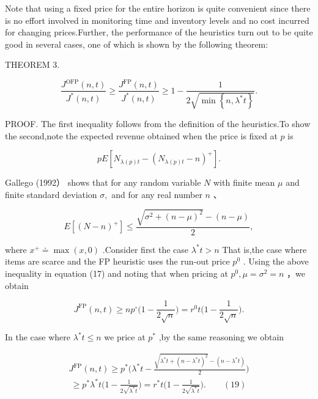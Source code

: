 Note that using a fixed price for the entire horizon is quite convenient
since there is no effort involved in monitoring time and inventory
levels and no cost incurred for changing prices.Further, the performance
of the heuristics turn out to be quite good in several cases, one of
which is shown by the following theorem:

THEOREM 3.

\[
\frac { J ^ { \mathrm { O F P } } ( n , t ) } { J ^ { * } ( n , t ) } \geq \frac { J ^ { \mathrm { F P } } ( n , t ) } { J ^ { * } ( n , t ) } \geq 1 - \frac { 1 } { 2 { \sqrt { \operatorname* { m i n } \left\{ n , \lambda ^ { * } t \right\} } } } .
\]

PROOF. The first inequality follows from the definition of the
heuristics.To show the second,note the expected revenue obtained when
the price is fixed at \(p\) is

\[
p E [ N _ { \lambda ( p ) t } - ( N _ { \lambda ( p ) t } - n ) ^ { + } ] .
\]

Gallego (1992） shows that for any random variable \(N\) with finite
mean \(\mu\) and finite standard deviation \(\sigma ,\) and for any real
number \(n\) 、

\[
E [ ( N - n ) ^ { + } ] \leq \frac { \sqrt { \sigma ^ { 2 } + ( n - \mu ) ^ { 2 } } - ( n - \mu ) } { 2 } ,
\]

where \({ { x } ^ { + } } \doteq \operatorname* { m a x } ( x , 0 )\)
.Consider first the case \(\lambda ^ { * } t > n\) That is,the case
where items are scarce and the FP heuristic uses the run-out price
\(p ^ { 0 }\) . Using the above inequality in equation (17) and noting
that when pricing at \(p ^ { 0 } , \mu = \sigma ^ { 2 } = n\) ，we
obtain

\[
J ^ { \mathrm { F P } } ( n , t ) \geq n p ^ { \circ } \Bigg ( 1 - \frac { 1 } { 2 \sqrt { n } } \Bigg ) = r ^ { 0 } t \Bigg ( 1 - \frac { 1 } { 2 \sqrt { n } } \Bigg ) .
\]

In the case where \(\lambda ^ { * } t \leq n\) we price at \(p ^ { * }\)
,by the same reasoning we obtain

\[
\begin{array} { l } { { \displaystyle { J ^ { \mathrm { F P } } ( n , t ) \geq p ^ { * } \bigg ( \lambda ^ { * } t - \frac { \sqrt { \lambda ^ { * } t + ( n - \lambda ^ { * } t ) ^ { 2 } } - ( n - \lambda ^ { * } t ) } { 2 } \bigg ) } } } \\ { { \displaystyle { \ \geq p ^ { * } \lambda ^ { * } t \bigg ( 1 - \frac { 1 } { 2 \sqrt { \lambda ^ { * } t } } \bigg ) = r ^ { * } t \bigg ( 1 - \frac { 1 } { 2 \sqrt { \lambda ^ { * } t } } \bigg ) . \qquad ( 1 9 ) } } } \end{array}
\]

